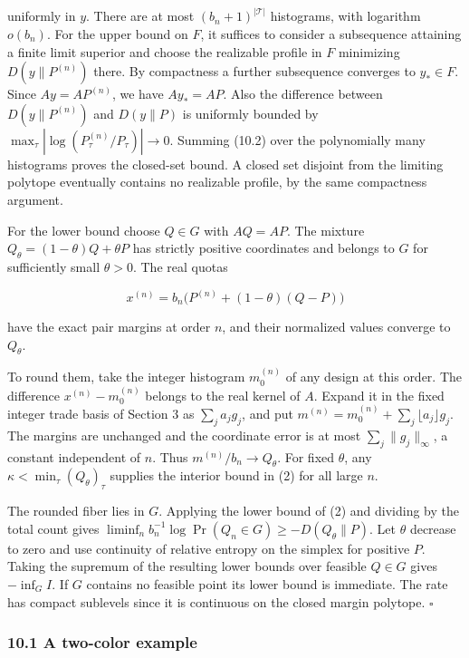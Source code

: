 \documentclass[english,11pt,a4paper]{article}
\begin{document}
uniformly in \(y\). There are at most \((b_n+1)^{|\mathcal T|}\) histograms, with logarithm \(o(b_n)\). For the upper bound on \(F\), it suffices to consider a subsequence attaining a finite limit superior and choose the realizable profile in \(F\) minimizing \(D(y\|P^{(n)})\) there. By compactness a further subsequence converges to \(y_*\in F\). Since \(Ay=AP^{(n)}\), we have \(Ay_*=AP\). Also the difference between \(D(y\|P^{(n)})\) and \(D(y\|P)\) is uniformly bounded by \(\max_\tau|\log(P_\tau^{(n)}/P_\tau)|\to0\). Summing (10.2) over the polynomially many histograms proves the closed-set bound. A closed set disjoint from the limiting polytope eventually contains no realizable profile, by the same compactness argument.

For the lower bound choose \(Q\in G\) with \(AQ=AP\). The mixture \(Q_\theta=(1-\theta)Q+\theta P\) has strictly positive coordinates and belongs to \(G\) for sufficiently small \(\theta>0\). The real quotas

\[x^{(n)}=b_n\bigl(P^{(n)}+(1-\theta)(Q-P)\bigr)\]

have the exact pair margins at order \(n\), and their normalized values converge to \(Q_\theta\).

To round them, take the integer histogram \(m_0^{(n)}\) of any design at this order. The difference \(x^{(n)}-m_0^{(n)}\) belongs to the real kernel of \(A\). Expand it in the fixed integer trade basis of Section 3 as \(\sum_j a_jg_j\), and put \(m^{(n)}=m_0^{(n)}+\sum_j\lfloor a_j\rfloor g_j\). The margins are unchanged and the coordinate error is at most \(\sum_j\|g_j\|_\infty\), a constant independent of \(n\). Thus \(m^{(n)}/b_n\to Q_\theta\). For fixed \(\theta\), any \(\kappa<\min_\tau(Q_\theta)_\tau\) supplies the interior bound in (2) for all large \(n\).

The rounded fiber lies in \(G\). Applying the lower bound of (2) and dividing by the total count gives \(\liminf_n b_n^{-1}\log\Pr(Q_n\in G)\ge-D(Q_\theta\|P)\). Let \(\theta\) decrease to zero and use continuity of relative entropy on the simplex for positive \(P\). Taking the supremum of the resulting lower bounds over feasible \(Q\in G\) gives \(-\inf_G I\). If \(G\) contains no feasible point its lower bound is immediate. The rate has compact sublevels since it is continuous on the closed margin polytope. \(\square\)

\subsubsection{10.1 A two-color example}\label{a-two-color-example}
\end{document}
